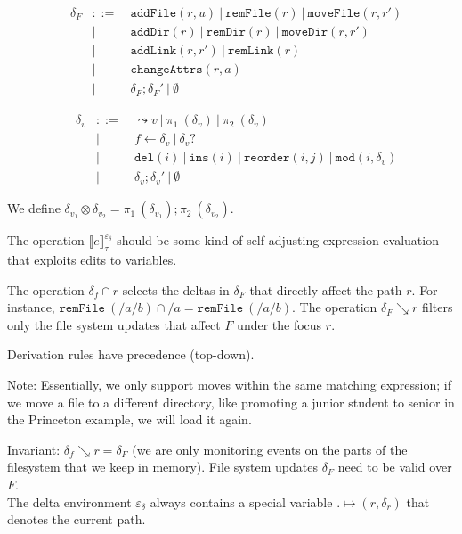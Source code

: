\documentclass[10pt,twoside,a4paper]{article}
\theoremstyle{theorem}
\theoremstyle{lemma}
\theoremstyle{property}
\begin{document}
\begin{align*}
	&\delta_F & ::= & ~\mathtt{addFile}(r,u) ~|~ \mathtt{remFile}(r) ~|~ \mathtt{moveFile}(r,r')\\
	&         & |   & ~\mathtt{addDir}(r) ~|~ \mathtt{remDir}(r) ~|~ \mathtt{moveDir}(r,r')\\
	&         & |   & ~\mathtt{addLink}(r,r') ~|~ \mathtt{remLink}(r)\\
	&         & |   & ~\mathtt{changeAttrs}(r,a)\\
	&         & |   & ~\delta_F ; {\delta_F}' ~|~ \emptyset
\end{align*}

\begin{align*}
	&\delta_v & ::= & ~\leadsto v ~|~ \pi_1~(\delta_v) ~|~ \pi_2~(\delta_v)\\
	&         & |   & ~f \leftarrow \delta_v ~|~ \delta_v?\\
	&         & |   & ~\mathtt{del}(i) ~|~ \mathtt{ins}(i) ~|~ \mathtt{reorder}(i,j) ~|~ \mathtt{mod}(i,\delta_v)\\
	&         & |   & ~\delta_v ; {\delta_v}' ~|~ \emptyset
\end{align*}

We define $\delta_{v_1} \otimes \delta_{v_2} = \pi_1~(\delta_{v_1}) ; \pi_2~(\delta_{v_2})$.

The operation $\llbracket e \rrbracket^{\varepsilon_\delta}_{\tau}$ should be some kind of self-adjusting expression evaluation that exploits edits to variables.

The operation $\delta_f \cap r$ selects the deltas in $\delta_F$ that directly affect the path $r$. For instance, $\mathtt{remFile}~(/a/b) \cap /a = \mathtt{remFile}~(/a/b)$. 
The operation $\delta_F \searrow r$ filters only the file system updates that affect $F$ under the focus $r$.

Derivation rules have precedence (top-down).

Note: Essentially, we only support moves within the same matching expression; if we move a file to a different directory, like promoting a junior student to senior in the Princeton example, we will load it again.

Invariant: $\delta_f \searrow r = \delta_F$ (we are only monitoring events on the parts of the filesystem that we keep in memory).
File system updates $\delta_F$ need to be valid over $F$.\\

The delta environment $\varepsilon_\delta$ always contains a special variable $. \mapsto (r,\delta_r)$ that denotes the current path.
\end{document}
